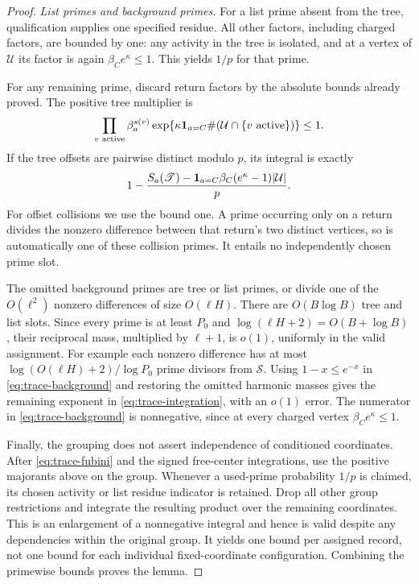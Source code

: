 \begin{proof}
\emph{List primes and background primes.}
For a list prime absent from the tree, qualification supplies one
specified residue.  All other factors, including charged factors,
are bounded by one: any activity in the tree is isolated, and at a
vertex of $\mathcal U$ its factor is again $\beta_Ce^\kappa\le1$.
This yields $1/p$ for that prime.

For any remaining prime, discard return factors by the absolute bounds
already proved.  The positive tree multiplier is
\[
 \prod_{v\text{ active}}\beta_a^{s(v)}
 \exp\{\kappa\mathbf 1_{a=C}\#(\mathcal U\cap\{v\text{ active}\})\}
 \le1.
\]
If the tree offsets are pairwise distinct modulo $p$, its integral is
exactly
\begin{equation}\label{eq:trace-background}
 1-\frac{S_a(\mathscr T)
       -\mathbf 1_{a=C}\beta_C(e^\kappa-1)|\mathcal U|}{p}.
\end{equation}
For offset collisions we use the bound one.  A prime occurring only on
a return divides the nonzero difference between that return's two
distinct vertices, so is automatically one of these collision primes.
It entails no independently chosen prime slot.

The omitted background primes are tree or list primes, or divide one
of the $O(\ell^2)$ nonzero differences of size $O(\ell H)$.
There are $O(B\log B)$ tree and list slots.  Since every prime is
at least $P_0$ and $\log(\ell H+2)=O(B+\log B)$, their reciprocal
mass, multiplied by $\ell+1$, is $o(1)$, uniformly in the valid
assignment.  For example each nonzero difference has at most
$\log(O(\ell H)+2)/\log P_0$ prime divisors from $\mathcal S$.
Using $1-x\le e^{-x}$ in \eqref{eq:trace-background} and restoring
the omitted harmonic masses gives the remaining exponent in
\eqref{eq:trace-integration}, with an $o(1)$ error.  The numerator in
\eqref{eq:trace-background} is nonnegative, since at every charged
vertex $\beta_C e^\kappa\le1$.

Finally, the grouping does not assert independence of conditioned
coordinates.  After \eqref{eq:trace-fubini} and the signed free-center
integrations, use the positive majorants above on the group.  Whenever
a used-prime probability $1/p$ is claimed, its chosen activity or list
residue indicator is retained.  Drop all other group restrictions and
integrate the resulting product over the remaining coordinates.  This
is an enlargement of a nonnegative integral and hence is valid despite
any dependencies within the original group.  It yields one bound per
assigned record, not one bound for each individual fixed-coordinate
configuration.  Combining the primewise bounds proves the lemma.
\end{proof}

